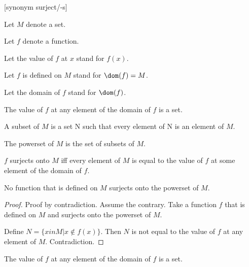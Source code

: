 \documentclass[a4paper,draft]{amsproc}
\begin{document}
\begin{forthel}

[synonym surject/-s]

Let $M$ denote a set.

Let $f$ denote a function.

Let the value of $f$ at $x$ stand for $f(x)$.

Let $f$ is defined on $M$ stand for $\dom(f) = M$.

Let the domain of $f$ stand for $\dom(f)$.


\begin{axiom}
The value of $f$ at any element of the domain of $f$ is a set.
\end{axiom}

\begin{definition}[subset]
A subset of $M$ is a set N such that every element of N is an element of $M$.
\end{definition}

\begin{definition}
The powerset of $M$ is the set of subsets of $M$.
\end{definition}

\begin{definition}
$f$ surjects onto $M$ iff every element of $M$ is equal to the value of $f$ at some element of the domain of $f$.
\end{definition}

\begin{proposition}
No function that is defined on $M$ surjects onto the powerset of $M$.
\end{proposition}
\begin{proof}
Proof by contradiction.
Assume the contrary. Take a function $f$ that is defined on $M$ and surjects onto the powerset of $M$.

Define $N = \{ x in M | x \notin f(x) \}$.
Then $N$ is not equal to the value of $f$ at any element of $M$.
Contradiction.
\end{proof}

\begin{theorem}
The value of $f$ at any element of the domain of $f$ is a set.
\end{theorem}

\end{forthel}
\end{document}
